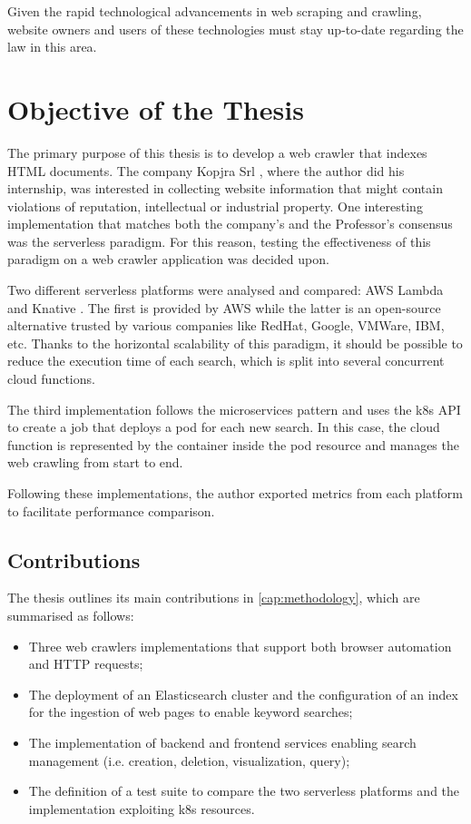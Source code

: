 \documentclass[../thesis.tex]{subfiles}
\begin{document}
Given the rapid technological advancements in web scraping and crawling, website owners and users of these technologies must stay up-to-date regarding the law in this area.

\section{Objective of the Thesis}\label{sec:objective_thesis}
The primary purpose of this thesis is to develop a web crawler that indexes \acrshort{HTML} documents. The company Kopjra Srl \cite{site:kopjra}, where the author did his internship, was interested in collecting website information that might contain violations of reputation, intellectual or industrial property. One interesting implementation that matches both the company's and the Professor's consensus was the serverless paradigm. For this reason, testing the effectiveness of this paradigm on a web crawler application was decided upon.

Two different serverless platforms were analysed and compared: \acrshort{AWS} Lambda \cite{site:aws_lambda} and Knative \cite{site:knative}. The first is provided by \acrshort{AWS} while the latter is an open-source alternative trusted by various companies like RedHat, Google, VMWare, IBM, etc. Thanks to the horizontal scalability of this paradigm, it should be possible to reduce the execution time of each search, which is split into several concurrent cloud functions.

The third implementation follows the microservices pattern and uses the \gls{k8s} \acrshort{API} \cite{article:k8s_history, site:k8s} to create a \gls{job} that deploys a \gls{pod} for each new search. In this case, the cloud function is represented by the \gls{container} inside the \gls{pod} resource and manages the web crawling from start to end.

Following these implementations, the author exported metrics from each platform to facilitate performance comparison.

\subsection{Contributions}
The thesis outlines its main contributions in \autoref{cap:methodology}, which are summarised as follows:

\begin{itemize}
    \item Three web crawlers implementations that support both browser automation and \acrshort{HTTP} requests;
    \item The deployment of an Elasticsearch \cite{site:elasticsearch, site:elasticsearch_quickstart} cluster and the configuration of an index for the ingestion of web pages to enable keyword searches;
    \item The implementation of backend and frontend services enabling search management (i.e. creation, deletion, visualization, query);
    \item The definition of a test suite to compare the two serverless platforms and the implementation exploiting \gls{k8s} \cite{article:k8s_history, site:k8s} resources.
\end{itemize}
\end{document}
